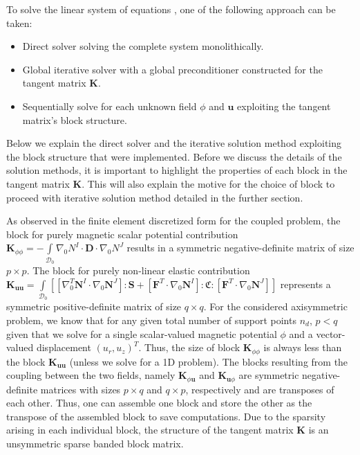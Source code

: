 \documentclass[11pt,a4paper,final]{article}
\begin{document}
To solve the linear system of equations , one of the following approach can be taken:
\begin{itemize}
\item Direct solver solving the complete system monolithically.
\item Global iterative solver with a global preconditioner constructed for the tangent matrix $\mathbf{K}$.
\item Sequentially solve for each unknown field $\phi$ and $\mathbf{u}$ exploiting the tangent matrix's block structure.
\end{itemize}
Below we explain the direct solver and the iterative solution method exploiting the block structure that were implemented. Before we discuss the details of the solution methods, it is important to highlight the properties of each block in the tangent matrix $\mathbf{K}$. This will also explain the motive for the choice of block to proceed with iterative solution method detailed in the further section.\par 

As observed in the finite element discretized form for the coupled problem, the block for purely magnetic scalar potential contribution $\mathbf{K}_{\phi \phi} = - \int\limits_{\mathcal{D}_0} \nabla_0 N^I \cdot \mathbf{D} \cdot \nabla_0 N^J$ results in a symmetric negative-definite matrix of size $p \times p$. The block for purely non-linear elastic contribution $\mathbf{K}_{\mathbf{u} \mathbf{u}} = \int\limits_{\mathcal{D}_0} \left[ \left[ \nabla_0^T \mathbf{N}^I \cdot \nabla_0 \mathbf{N}^J \right] : \mathbf{S} + \left[ \mathbf{F}^T \cdot \nabla_0 \mathbf{N}^I \right] : \mathfrak{C} : \left[ \mathbf{F}^T \cdot \nabla_0 \mathbf{N}^J \right] \right]$ represents a symmetric positive-definite matrix of size $q \times q$. For the considered axisymmetric problem, we know that for any given total number of support points $n_d$, $p < q$ given that we solve for a single scalar-valued magnetic potential $\phi$ and a vector-valued displacement $(u_r, u_z)^T$. Thus, the size of block $\mathbf{K}_{\phi \phi}$ is always less than the block $\mathbf{K}_{\mathbf{u} \mathbf{u}}$ (unless we solve for a 1D problem). The blocks resulting from the coupling between the two fields, namely $\mathbf{K}_{\phi \mathbf{u}}$ and $\mathbf{K}_{\mathbf{u} \phi}$ are symmetric negative-definite matrices with sizes $p \times q$ and $q \times p$, respectively and are transposes of each other. Thus, one can assemble one block and store the other as the transpose of the assembled block to save computations. Due to the sparsity arising in each individual block, the structure of the tangent matrix $\mathbf{K}$ is an unsymmetric sparse banded block matrix.\par 
\end{document}
